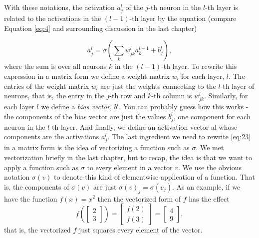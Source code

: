 \documentclass[a4paper,twoside,10pt]{book}
\begin{document}
With these notations, the activation $a^l_j$ of the $j$-th neuron in the $l$-th layer is related to the activations in the $(l−1)$-th layer by the equation (compare Equation \ref{eq:4} and surrounding discussion in the last chapter)

\begin{equation}
	a^{l}_j = \sigma\left( \sum_k w^{l}_{jk} a^{l-1}_k + b^l_j \right),\label{eq:23}
\end{equation}
where the sum is over all neurons $k$ in the $(l−1)$-th layer. To rewrite this expression in a matrix form we define a weight matrix $w_l$ for each layer, $l$. The entries of the weight matrix $w_l$ are just the weights connecting to the $l$-th layer of neurons, that is, the entry in the $j$-th row and $k$-th column is $w^l_{jk}$. Similarly, for each layer $l$ we define a \textit{bias vector}, $b^l$. You can probably guess how this works - the components of the bias vector are just the values $b^l_j$, one component for each neuron in the $l$-th layer. And finally, we define an activation vector al whose components are the activations $a^l_j$.
The last ingredient we need to rewrite \ref{eq:23} in a matrix form is the idea of vectorizing a function such as $\sigma$. We met vectorization briefly in the last chapter, but to recap, the idea is that we want to apply a function such as $\sigma$ to every element in a vector $v$. We use the obvious notation $\sigma(v)$ to denote this kind of elementwise application of a function. That is, the components of $\sigma(v)$ are just $\sigma(v)_j = \sigma(v_j)$. As an example, if we have the function $f(x)=x^2$ then the vectorized form of $f$ has the effect
\begin{equation}
f\left(\left[ \begin{array}{c} 2 \\ 3 \end{array} \right] \right)
= \left[ \begin{array}{c} f(2) \\ f(3) \end{array} \right]
= \left[ \begin{array}{c} 4 \\ 9 \end{array} \right],
\label{eq:24}
\end{equation}
that is, the vectorized $f$ just squares every element of the vector.
\end{document}
